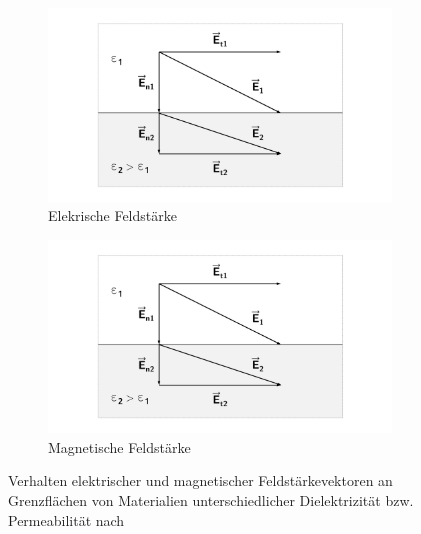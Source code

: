 \begin{figure}[ht]
    \centering
    \begin{subfigure}[b]{0.4\textwidth}
        \includegraphics[page = 1, width=\textwidth, trim = 4.8cm 1cm 4.8cm 1cm, clip]{Abbildungen/Kapitel2/Feldvektoren_an_Grenzflaechen.pdf}
        \caption{Elekrische Feldstärke}\label{subfig:2_Elektrische_Feldstaerke_an_Grenzflaeche}
    \end{subfigure}
    \hspace{2cm}
    \begin{subfigure}[b]{0.4\textwidth}
        \includegraphics[page = 2, width=\textwidth, trim = 4.8cm 1cm 4.8cm 1cm, clip]{Abbildungen/Kapitel2/Feldvektoren_an_Grenzflaechen.pdf}
        \caption{Magnetische Feldstärke}\label{subfig:2_Magnetische_Feldstaerke_an_Grenzflaeche}
    \end{subfigure}
    \caption[Verhalten elektrischer und magnetischer Feldstärkevektoren an Grenzflächen von Materialien unterschiedlicher Dielektrizität bzw. Permeabilität]{Verhalten elektrischer und magnetischer Feldstärkevektoren an Grenzflächen von \mbox{Materialien} unterschiedlicher Dielektrizität bzw. Permeabilität nach~\cite{EM_Schirmung}}
    \label{fig:2_Feldstaerken_an_Grenzflaechen}
\end{figure}

